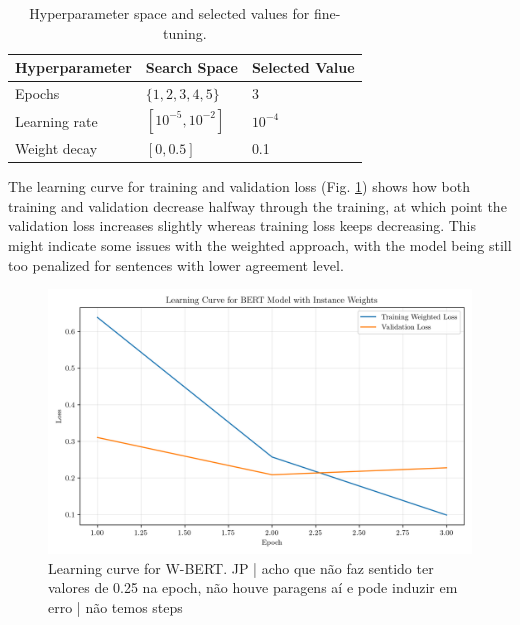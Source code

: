 \documentclass[conference]{IEEEtran}
\begin{document}

\begin{table}[H]
\centering
\caption{Hyperparameter space and selected values for fine-tuning.}
\label{parameters_wbert}
\begin{tabular}{lll}
\toprule
\textbf{Hyperparameter} & \textbf{Search Space} & \textbf{Selected Value} \\
\midrule
Epochs & $\{1, 2, 3, 4, 5\}$ & 3 \\
Learning rate & $[10^{-5}, 10^{-2}]$ & $10^{-4}$ \\
Weight decay & $[0, 0.5]$ & 0.1 \\
\bottomrule
\end{tabular}
\end{table}






The learning curve for training and validation loss (Fig. \ref{fig:weighted_bert_learning_curve}) shows how both training and validation decrease halfway through the training, at which point the validation loss increases slightly whereas training loss keeps decreasing. This might indicate some issues with the weighted approach, with the model being still too penalized for sentences with lower agreement level.


\begin{figure}[H]
    \centering
    \includegraphics[width=1\linewidth]{assets/weighted_bert_learning_curve.png}
    \caption{Learning curve for W-BERT. JP | acho que não faz sentido ter valores de 0.25 na epoch, não houve paragens aí e pode induzir em erro | não temos steps}
    \label{fig:weighted_bert_learning_curve}
\end{figure}
\end{document}
